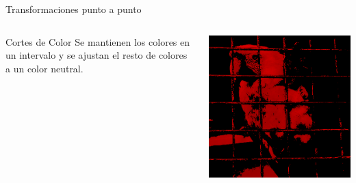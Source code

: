 \documentclass{beamer}
\begin{document}
\begin{frame}{Transformaciones punto a punto}
\begin{columns}
\column[t]{5cm}
\begin{block}{Cortes de Color}
\justifying
Se mantienen los colores en un intervalo y se ajustan el resto de colores a un color neutral.
\end{block}
\includegraphics[scale=0.15]{./.Presentation/red}
\end{columns}

\end{frame}
\end{document}
